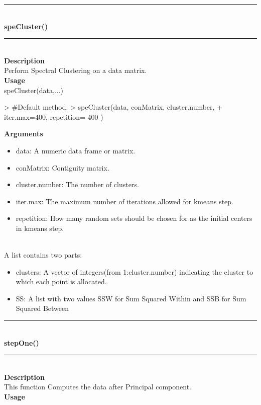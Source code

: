 \documentclass{article}
\begin{document}
\noindent\rule{14cm}{0.4pt}\\
{\bf \large speCluster()} \\
\noindent\rule{14cm}{0.4pt}\\
{\bf Description}\\
Perform Spectral Clustering on a data matrix.\\
{\bf Usage}\\

speCluster(data,...)
\begin{Schunk}
\begin{Sinput}
>   #Default method:
>  speCluster(data, conMatrix, cluster.number, 
+             iter.max=400, repetition= 400 )
\end{Sinput}
\end{Schunk}
{\bf Arguments}
\begin {itemize}
\item data: A numeric data frame or matrix.
\item conMatrix: Contiguity matrix.
\item cluster.number: The number of clusters.
\item iter.max: The maximum number of iterations allowed for kmeans step. 
\item repetition: How  many  random  sets  should  be  chosen for  as  the  initial centers in kmeans step.
\end {itemize}
\hspace*{5mm}{\bf Returns}\\
 A list contains two parts:
 \begin{itemize}
 \item clusters: A vector of integers(from 1:cluster.number) indicating the cluster to which each point is allocated.
 \item SS: A list with two values SSW for Sum Squared Within and SSB for Sum Squared Between
 \end{itemize}
 
 \noindent\rule{14cm}{0.4pt}\\
{\bf \large stepOne()} \\
\noindent\rule{14cm}{0.4pt}\\
{\bf Description}\\
This function Computes the data after Principal component.\\
{\bf Usage}\\
\end{document}

